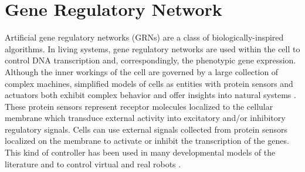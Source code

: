 \section{Gene Regulatory Network}

Artificial gene regulatory networks (GRNs) are a class of biologically-inspired
algorithms. In living systems, gene regulatory networks are used within the cell
to control DNA transcription and, correspondingly, the phenotypic gene
expression. Although the inner workings of the cell are governed by a large collection
of complex machines, simplified models of cells as entities with protein sensors and actuators
both exhibit complex behavior and offer insights into natural systems \cite{Davidson2006}.
These protein sensors represent receptor molecules localized to the cellular membrane
which transduce external activity into excitatory and/or inhibitory regulatory signals.
Cells can use external signals collected from protein sensors localized
on the membrane to activate or inhibit the transcription of the genes.
This kind of controller has been used in many developmental models of the
literature \cite{Joachimczak08, Doursat09, CussatBlanc2012a} and to control
virtual and real robots \cite{ziegler2001evolving, Nicolau10, Joachimczak10, CussatBlanc2012b}. 

